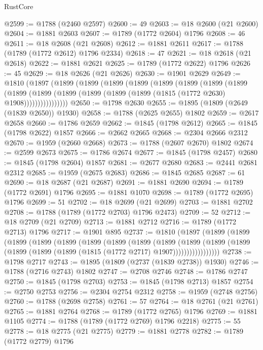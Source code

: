 \begin{lexlean}{RustCore}
\begin{coremodule}
@2599 := @1788 (@2460 @2597)
@2600 := 49
@2603 := @18 @2600 (@21 @2600)
@2604 := @1881 @2603
@2607 := @1789 (@1772 @2604) @1796
@2608 := 46
@2611 := @18 @2608 (@21 @2608)
@2612 := @1881 @2611
@2617 := @1788 (@1789 (@1772 @2612) @1796 @2334)
@2618 := 47
@2621 := @18 @2618 (@21 @2618)
@2622 := @1881 @2621
@2625 := @1789 (@1772 @2622) @1796
@2626 := 45
@2629 := @18 @2626 (@21 @2626)
@2630 := @1901 @2629
@2649 := @1810
    (@1897
      (@1899
        (@1899
          (@1899
            (@1899
              (@1899
                (@1899
                  (@1899
                    (@1899
                      (@1899
                        (@1899
                          (@1899 (@1899 (@1899 (@1899 (@1815 (@1772 @2630) @1908))))))))))))))))
@2650 := @1798 @2630
@2655 := @1895 (@1809 (@2649 (@1839 @2650)) @1930)
@2658 := @1788 (@2625 @2655) @1802
@2659 := @2617 @2658
@2660 := @1786 @2659
@2662 := @1845 (@1798 @2612)
@2665 := @1845 (@1798 @2622) @1857
@2666 := @2662 @2665
@2668 := @2304 @2666 @2312
@2670 := @1959 (@2660 @2668)
@2673 := @1788 (@2607 @2670) @1802
@2674 := @2599 @2673
@2675 := @1786 @2674
@2677 := @1845 (@1798 @2457)
@2680 := @1845 (@1798 @2604) @1857
@2681 := @2677 @2680
@2683 := @2441 @2681 @2312
@2685 := @1959 (@2675 @2683)
@2686 := @1845 @2685
@2687 := 61
@2690 := @18 @2687 (@21 @2687)
@2691 := @1881 @2690
@2694 := @1789 (@1772 @2691) @1796
@2695 := @1881 @1070
@2698 := @1789 (@1772 @2695) @1796
@2699 := 51
@2702 := @18 @2699 (@21 @2699)
@2703 := @1881 @2702
@2708 := @1788 (@1789 (@1772 @2703) @1796 @2473)
@2709 := 52
@2712 := @18 @2709 (@21 @2709)
@2713 := @1881 @2712
@2716 := @1789 (@1772 @2713) @1796
@2717 := @1901 @895
@2737 := @1810
    (@1897
      (@1899
        (@1899
          (@1899
            (@1899
              (@1899
                (@1899
                  (@1899
                    (@1899
                      (@1899
                        (@1899
                          (@1899
                            (@1899 (@1899 (@1899 (@1899 (@1815 (@1772 @2717) @1907)))))))))))))))))
@2738 := @1798 @2717
@2743 := @1895 (@1809 (@2737 (@1839 @2738)) @1930)
@2746 := @1788 (@2716 @2743) @1802
@2747 := @2708 @2746
@2748 := @1786 @2747
@2750 := @1845 (@1798 @2703)
@2753 := @1845 (@1798 @2713) @1857
@2754 := @2750 @2753
@2756 := @2304 @2754 @2312
@2758 := @1959 (@2748 @2756)
@2760 := @1788 (@2698 @2758)
@2761 := 57
@2764 := @18 @2761 (@21 @2761)
@2765 := @1881 @2764
@2768 := @1789 (@1772 @2765) @1796
@2769 := @1881 @1105
@2774 := @1788 (@1789 (@1772 @2769) @1796 @2218)
@2775 := 55
@2778 := @18 @2775 (@21 @2775)
@2779 := @1881 @2778
@2782 := @1789 (@1772 @2779) @1796

\end{coremodule}
\end{lexlean}
